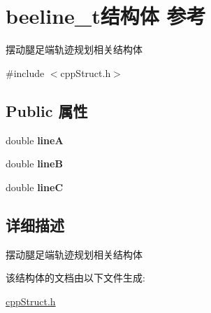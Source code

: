 \hypertarget{structbeeline__t}{}\section{beeline\+\_\+t结构体 参考}
\label{structbeeline__t}


摆动腿足端轨迹规划相关结构体  




{\ttfamily \#include $<$cpp\+Struct.\+h$>$}

\subsection*{Public 属性}
\begin{DoxyCompactItemize}
\item 
\mbox{\label{structbeeline__t_a6568a89c44f807b1d3a6e87dded6ca9a}} 
double {\bfseries lineA}
\item 
\mbox{\label{structbeeline__t_a252082cc48884b3dc790cb0be82922db}} 
double {\bfseries lineB}
\item 
\mbox{\label{structbeeline__t_a45cd6263427cd0ae80f1de4f7bf82fbb}} 
double {\bfseries lineC}
\end{DoxyCompactItemize}


\subsection{详细描述}
摆动腿足端轨迹规划相关结构体 

该结构体的文档由以下文件生成\+:\begin{DoxyCompactItemize}
\item 
\hyperlink{cppStruct_8h}{cpp\+Struct.\+h}\end{DoxyCompactItemize}
